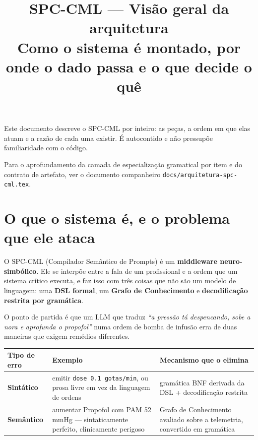 \documentclass[11pt,a4paper]{article}
\title{\textbf{SPC-CML — Visão geral da arquitetura}\\[2mm]
       \large Como o sistema é montado, por onde o dado passa e o que decide o quê}
\author{}
\date{}
\newcommand{\arq}[1]{\texttt{\small #1}}
\begin{document}
\maketitle
\thispagestyle{empty}

\begin{center}
\begin{minipage}{0.88\linewidth}
\small
Este documento descreve o SPC-CML por inteiro: as peças, a ordem em que elas
atuam e a razão de cada uma existir. É autocontido e não pressupõe
familiaridade com o código.

Para o aprofundamento da camada de especialização gramatical por item e do
contrato de artefato, ver o documento companheiro
\arq{docs/arquitetura-spc-cml.tex}.
\end{minipage}
\end{center}

\vspace{4mm}
\tableofcontents
\newpage

\section{O que o sistema é, e o problema que ele ataca}

O SPC-CML (Compilador Semântico de Prompts) é um \textbf{middleware
neuro-simbólico}. Ele se interpõe entre a fala de um profissional e a ordem que
um sistema crítico executa, e faz isso com três coisas que não são um modelo de
linguagem: uma \textbf{DSL formal}, um \textbf{Grafo de Conhecimento} e
\textbf{decodificação restrita por gramática}.

O ponto de partida é que um LLM que traduz \emph{``a pressão tá despencando,
sobe a nora e aprofunda o propofol''} numa ordem de bomba de infusão erra de
duas maneiras que exigem remédios diferentes.

\begin{center}
\small
\begin{tabular}{@{}p{2.4cm}p{5.2cm}p{6.2cm}@{}}
\toprule
\textbf{Tipo de erro} & \textbf{Exemplo} & \textbf{Mecanismo que o elimina}\\
\midrule
\textbf{Sintático} & emitir \texttt{dose 0.1 gotas/min}, ou prosa livre em vez
da linguagem de ordens & gramática BNF derivada da DSL + decodificação
restrita\\[3pt]
\textbf{Semântico} & aumentar Propofol com PAM 52\,mmHg --- sintaticamente
perfeito, clinicamente perigoso & Grafo de Conhecimento avaliado sobre a
telemetria, convertido em gramática\\
\bottomrule
\end{tabular}
\end{center}
\end{document}
